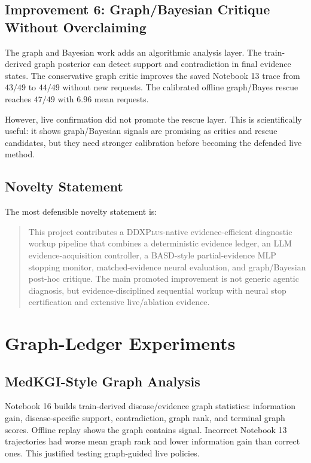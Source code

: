 \documentclass[11pt]{article}
\newcommand{\ddx}{\textsc{DDXPlus}}
\newcommand{\mlp}{\textsc{MLP}}
\newcommand{\llm}{\textsc{LLM}}
\begin{document}
\subsection{Improvement 6: Graph/Bayesian Critique Without Overclaiming}

The graph and Bayesian work adds an algorithmic analysis layer. The train-derived graph posterior can detect support and contradiction in final evidence states. The conservative graph critic improves the saved Notebook 13 trace from $43/49$ to $44/49$ without new requests. The calibrated offline graph/Bayes rescue reaches $47/49$ with $6.96$ mean requests.

However, live confirmation did not promote the rescue layer. This is scientifically useful: it shows graph/Bayesian signals are promising as critics and rescue candidates, but they need stronger calibration before becoming the defended live method.

\subsection{Novelty Statement}

The most defensible novelty statement is:
\begin{quote}
This project contributes a \ddx{}-native evidence-efficient diagnostic workup pipeline that combines a deterministic evidence ledger, an \llm{} evidence-acquisition controller, a BASD-style partial-evidence \mlp{} stopping monitor, matched-evidence neural evaluation, and graph/Bayesian post-hoc critique. The main promoted improvement is not generic agentic diagnosis, but evidence-disciplined sequential workup with neural stop certification and extensive live/ablation evidence.
\end{quote}

\section{Graph-Ledger Experiments}

\subsection{MedKGI-Style Graph Analysis}

Notebook 16 builds train-derived disease/evidence graph statistics: information gain, disease-specific support, contradiction, graph rank, and terminal graph scores. Offline replay shows the graph contains signal. Incorrect Notebook 13 trajectories had worse mean graph rank and lower information gain than correct ones. This justified testing graph-guided live policies.
\end{document}
